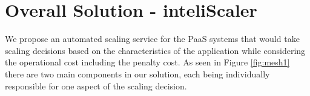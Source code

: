 \section{Overall Solution - inteliScaler}
We propose an automated scaling service for the PaaS systems that would take scaling decisions based on the characteristics of the application while considering the operational cost including the penalty cost. As seen in Figure \ref{fig:mesh1} there are two main components in our solution, each being individually responsible for one aspect of the scaling decision.